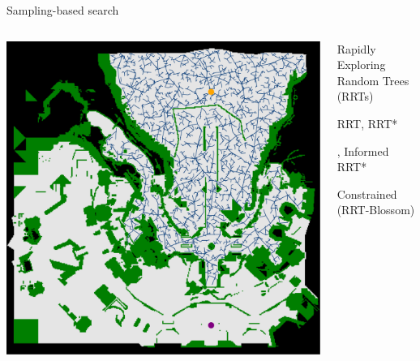 \documentclass[aspectratio=169]{beamer}
\makeatletter
\newcommand{\red}[1]{{\color{pureminimalistic@text@red} #1}}
\newcommand{\gr}[1]{{\color{grey} #1}}
\makeatother
\begin{document}
\begin{frame}[plain]{Sampling-based search}
  \begin{columns}[T]
      \begin{column}{.35\linewidth}
      \vspace{0.05\textheight}
      \includegraphics[height=0.7\textheight, keepaspectratio]{figures/da_one_off.pdf}
      \end{column}
      \begin{column}{.65\linewidth}
          \begin{vfilleditems}
              \item {\Large Rapidly Exploring Random Trees \red{(RRTs)}}
              \begin{itemize}
                  \item RRT, RRT* \gr{, Informed RRT*
                  \item Constrained (RRT-Blossom)
}
\end{itemize}
\end{vfilleditems}
\end{column}
\end{columns}
\end{frame}
\end{document}
